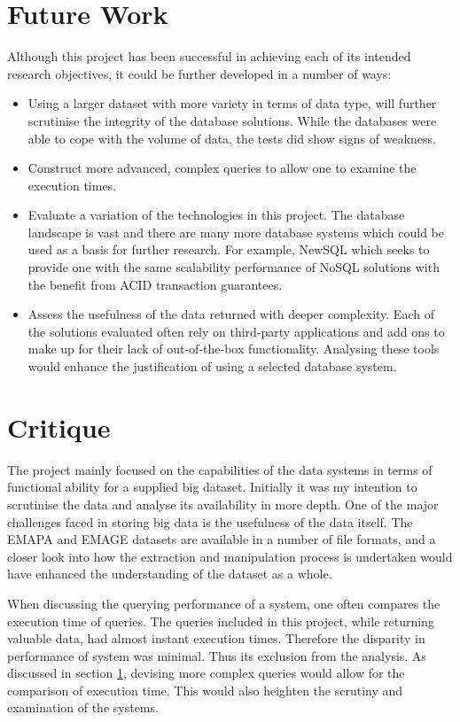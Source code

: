 \section{Future Work}\label{futurework}
Although this project has been successful in achieving each of its intended research objectives, it could be further developed in a number of ways:

\begin{itemize}
\item Using a larger dataset with more variety in terms of data type, will further scrutinise the integrity of the database solutions. While the databases were able to cope with the volume of data, the tests did show signs of weakness.
\item Construct more advanced, complex queries to allow one to examine the execution times.
\item Evaluate a variation of the technologies in this project. The database landscape is vast and there are many more database systems which could be used as a basis for further research. For example, NewSQL which seeks to provide one with the same scalability performance of NoSQL solutions with the benefit from ACID transaction guarantees.
\item Assess the usefulness of the data returned with deeper complexity. Each of the solutions evaluated often rely on third-party applications and add ons to make up for their lack of out-of-the-box functionality. Analysing these tools would enhance the justification of using a selected database system.
\end{itemize}

\section{Critique}\label{critique}
The project mainly focused on the capabilities of the data systems in terms of functional ability for a supplied big dataset. Initially it was my intention to scrutinise the data and analyse its availability in more depth. One of the major challenges faced in storing big data is the usefulness of the data itself. The EMAPA and EMAGE datasets are available in a number of file formats, and a closer look into how the extraction and manipulation process is undertaken would have enhanced the understanding of the dataset as a whole.

When discussing the querying performance of a system, one often compares the execution time of queries. The queries included in this project, while returning valuable data, had almost instant execution times. Therefore the disparity in performance of system was minimal. Thus its exclusion from the analysis. As discussed in section \ref{futurework}, devising more complex queries would allow for the comparison of execution time. This would also heighten the scrutiny and examination of the systems.

